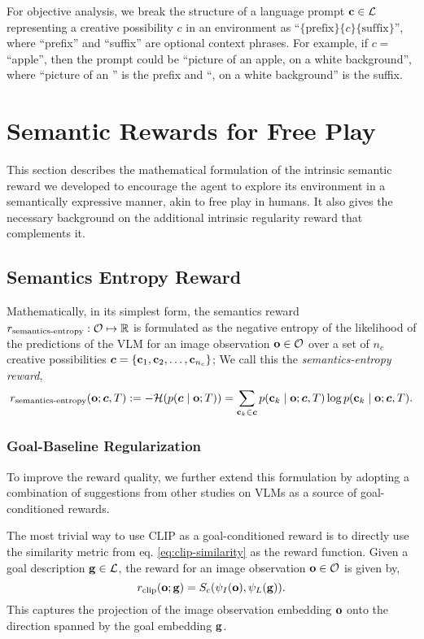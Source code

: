 For objective analysis, we break the structure of a language prompt \(\mathbf{c} \in \mathcal{L}\) representing a creative possibility \(c\) in an environment as ``\(\{\text{prefix}\}\{c\}\{\text{suffix}\}\)'', where ``prefix'' and ``suffix'' are optional context phrases. For example, if \(c =\) ``apple'', then the prompt could be ``picture of an apple, on a white background'', where ``picture of an '' is the prefix and ``, on a white background'' is the suffix.

\section{Semantic Rewards for Free Play}
\label{sec:semantics-reward}
This section describes the mathematical formulation of the intrinsic semantic reward we developed to encourage the agent to explore its environment in a semantically expressive manner, akin to free play in humans.
It also gives the necessary background on the additional intrinsic regularity reward that complements it.

\subsection{Semantics Entropy Reward}
\label{sec:entropy-reward}

Mathematically, in its simplest form, the semantics reward \(r_{\text{semantics-entropy}}: \mathcal{O} \mapsto \mathbb{R}\) is formulated as the negative entropy of the likelihood of the predictions of the VLM for an image observation \(\mathbf{o} \in \mathcal{O}\) over a set of \(n_c\) creative possibilities \(\bm{c} = \{ \mathbf{c}_1, \mathbf{c}_2, \ldots, \mathbf{c}_{n_c} \}\);
We call this the \emph{semantics-entropy reward},
\begin{equation}
    \label{eq:entropy-reward}
    r_{\text{semantics-entropy}}(\mathbf{o}; \bm{c}, T) := -\mathcal{H}(p(\bm{c} \mid \mathbf{o}; T)) = \sum_{\mathbf{c}_k \in \bm{c}} p(\mathbf{c}_k \mid \mathbf{o}; \bm{c}, T) \log p(\mathbf{c}_k \mid \mathbf{o}; \bm{c}, T).
\end{equation}
% 
\subsubsection{Goal-Baseline Regularization}
\label{sec:goal-baseline}
To improve the reward quality, we further extend this formulation by adopting a combination of suggestions from other studies on VLMs as a source of goal-conditioned rewards.

The most trivial way to use CLIP as a goal-conditioned reward is to directly use the similarity metric from eq. \eqref{eq:clip-similarity} as the reward function.
Given a goal description \(\mathbf{g} \in \mathcal{L}\), the reward for an image observation \(\mathbf{o} \in \mathcal{O}\) is given by,
\begin{equation}
    \label{eq:trivial-reward}
    r_{\text{clip}}(\mathbf{o}; \mathbf{g}) = S_c(\psi_I(\mathbf{o}), \psi_L(\mathbf{g})).
\end{equation}
This captures the projection of the image observation embedding \(\mathbf{o}\) onto the direction spanned by the goal embedding \(\mathbf{g}\).

